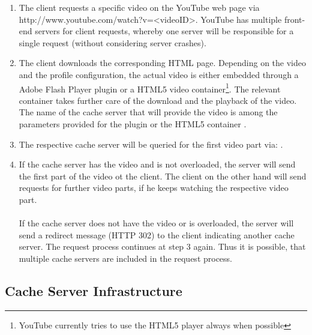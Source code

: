 \begin{enumerate}
  \item The client requests a specific video on the YouTube web page via http://www.youtube.com/watch?v=<videoID>. YouTube has multiple front-end servers for client requests, whereby one server will be responsible for a single request (without considering server crashes).
  
  \item The client downloads the corresponding HTML page. Depending on the video and the profile configuration, the actual video is either embedded through a Adobe Flash Player plugin or a HTML5 video container\footnote{YouTube currently tries to use the HTML5 player always when possible\cite{misc:youtube_html5}}. The relevant container takes further care of the download and the playback of the video. The name of the cache server that will provide the video is among the parameters provided for the plugin or the HTML5 container \cite{inpr:server_selection}.
  
  \item The respective cache server will be queried for the first video part via: . 

  \item If the cache server has the video and is not overloaded, the server will send the first part of the video ot the client. The client on the other hand will send requests for further video parts, if he keeps watching the respective video part. \\
\\
If the cache server does not have the video or is overloaded, the server will send a redirect message (HTTP 302) to the client indicating another cache server. The request process continues at step 3 again. Thus it is possible, that multiple cache servers are included in the request process.
\end{enumerate}

\subsection{Cache Server Infrastructure}

